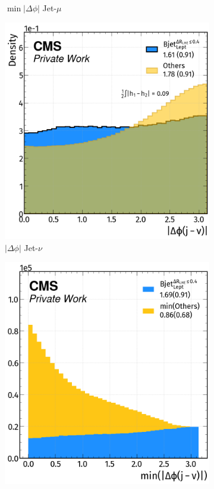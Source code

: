 \begin{figure}[H]
\begin{subfigure}{0.46\linewidth}
        \caption{$\min |\Delta \phi|$ Jet-$\mu$}
    \end{subfigure}  
    \hfill
    \begin{subfigure}{0.49\linewidth}
        \centering
        \includegraphics[width=1\linewidth]{fig//chap08-kin_reco/dphi_nu.png}
        \caption{$|\Delta \phi|$ Jet-$\nu$}
    \end{subfigure}
    \hfill
    \begin{subfigure}{0.48\linewidth}  
        \centering
        \includegraphics[width=1\linewidth]{fig//chap08-kin_reco/min_dphi_nu.png}

\end{subfigure}
\end{figure}
